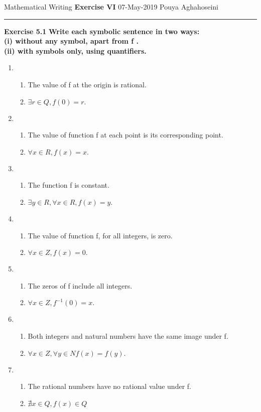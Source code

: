 \documentclass{article}
\begin{document}
	\noindent
	Mathematical Writing \hfill \textbf{Exercise VI} \newline 
	{07-May-2019} \hfill Pouya Aghahoseini
	
	\noindent
	\rule{\linewidth}{0.4pt}
	\textbf{\large\color{blue} Exercise 5.1}   \textbf{Write each symbolic sentence in two ways:\\
		(i) without any symbol, apart from f .\\
		(ii) with symbols only, using quantifiers.}
	
	\begin{enumerate}
		\item 
		\begin{enumerate}[label=\roman*]
			\item The value of f at the origin is rational.
			\item $\exists r \in Q , f(0)=r.$
		\end{enumerate}
		\item
		\begin{enumerate}[label=\roman*]
			\item The value of function f at each point is its corresponding point. 
			\item $\forall x \in R, f(x)=x. $
		\end{enumerate}
		\item
		\begin{enumerate}[label=\roman*]
			\item The function f is constant.
			\item $\exists y \in R, \forall x \in R, f(x)=y. $
		\end{enumerate}
		\item
		\begin{enumerate}[label=\roman*]
			\item  The value of function f, for all integers, is zero.
			\item  $\forall x \in Z, f(x)=0. $
		\end{enumerate}
		\item
		\begin{enumerate}[label=\roman*]
			\item The zeros of f include all integers.
			\item $\forall x \in Z, f^{-1}(0)=x. $
		\end{enumerate}
		\item
		\begin{enumerate}[label=\roman*]
			\item  Both integers and natural numbers have the same image under f.
			\item $\forall x \in Z, \forall y \in N f(x)=f(y). $
		\end{enumerate}
		\item
		\begin{enumerate}[label=\roman*]
			\item The rational numbers have no rational value under f.
			\item $\nexists x \in Q, f(x)\in Q$
		\end{enumerate}
	\end{enumerate}
	
\end{document}
